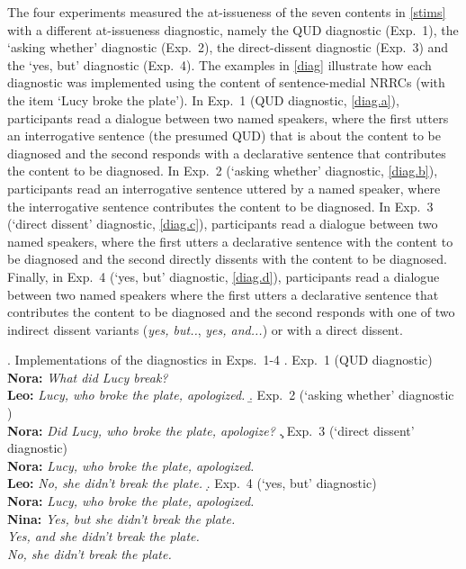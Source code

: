 \documentclass[times,linguex,xcolor]{glossa}
\begin{document}
  The four experiments measured the at-issueness of the seven contents in \ref{stims} with a different at-issueness diagnostic, namely the QUD diagnostic (Exp.~1), the `asking whether' diagnostic (Exp.~2), the direct-dissent diagnostic (Exp.~3) and the `yes, but' diagnostic (Exp.~4). The examples in \ref{diag} illustrate how each diagnostic was implemented using the content of sentence-medial NRRCs (with the item `Lucy broke the plate'). In Exp.~1 (QUD diagnostic, \ref{diag.a}), participants read a dialogue between two named speakers, where the first utters an interrogative sentence (the presumed QUD) that is about the content to be diagnosed and the second responds with a declarative sentence that contributes the content to be diagnosed. In Exp.~2 (`asking whether' diagnostic, \ref{diag.b}), participants read an interrogative sentence uttered by a named speaker, where the interrogative sentence contributes the content to be diagnosed. In Exp.~3 (`direct dissent' diagnostic, \ref{diag.c}), participants read a dialogue between two named speakers, where the first utters a declarative sentence with the content to be diagnosed and the second directly dissents with the content to be diagnosed. Finally, in Exp.~4 (`yes, but' diagnostic, \ref{diag.d}), participants read a dialogue between two named speakers where the first utters a declarative sentence that contributes the content to be diagnosed and the second responds with one of two indirect dissent variants (\emph{yes, but..}, \emph{yes, and...}) or with a direct dissent.

  \ex.\label{diag} Implementations of the diagnostics in Exps.~1-4
  \a.\label{diag.a} Exp.~1 (QUD diagnostic)
  \\ {\bf Nora:} \emph{What did Lucy break?}
  \\ {\bf Leo:} \emph{Lucy, who broke the plate, apologized.}
  \b.\label{diag.b} Exp.~2 (`asking whether' diagnostic )
  \\ {\bf Nora:} \emph{Did Lucy, who broke the plate, apologize?}
  \c.\label{diag.c} Exp.~3 (`direct dissent' diagnostic)
  \\ {\bf Nora:} \emph{Lucy, who broke the plate, apologized.}
  \\ {\bf Leo:} \emph{No, she didn't break the plate.}
  \d.\label{diag.d} Exp.~4 (`yes, but' diagnostic)
  \\ {\bf Nora:} \emph{Lucy, who broke the plate, apologized.}
  \\ {\bf Nina:} \emph{Yes, but she didn't break the plate.}
  \\ \hspace*{1cm} \emph{Yes, and she didn't break the plate.}
  \\ \hspace*{1cm} \emph{No, she didn't break the plate.}
\end{document}
